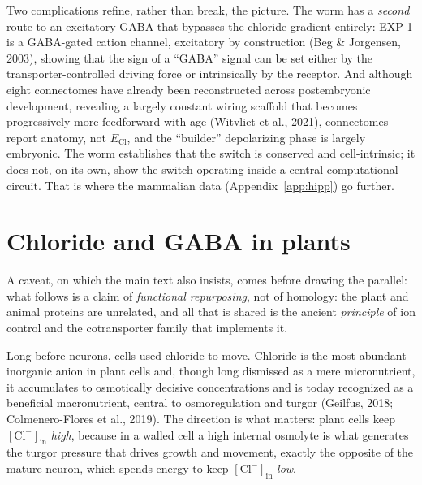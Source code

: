 \documentclass[11pt,a4paper]{article}
\newcommand{\Clm}{\mathrm{Cl}^{-}}
\newcommand{\ECl}{E_{\mathrm{Cl}}}
\begin{document}
Two complications refine, rather than break, the picture. The worm has a \emph{second} route to an excitatory GABA that bypasses the chloride gradient entirely: EXP-1 is a GABA-gated cation channel, excitatory by construction (Beg \& Jorgensen, 2003), showing that the sign of a ``GABA'' signal can be set either by the transporter-controlled driving force or intrinsically by the receptor. And although eight connectomes have already been reconstructed across postembryonic development, revealing a largely constant wiring scaffold that becomes progressively more feedforward with age (Witvliet et al., 2021), connectomes report anatomy, not $\ECl$, and the ``builder'' depolarizing phase is largely embryonic. The worm establishes that the switch is conserved and cell-intrinsic; it does not, on its own, show the switch operating inside a central computational circuit. That is where the mammalian data (Appendix~\ref{app:hipp}) go further.

\FloatBarrier
\section{Chloride and GABA in plants}\label{app:plants}
A caveat, on which the main text also insists, comes before drawing the parallel: what follows is a claim of \emph{functional repurposing}, not of homology: the plant and animal proteins are unrelated, and all that is shared is the ancient \emph{principle} of ion control and the cotransporter family that implements it.

Long before neurons, cells used chloride to move. Chloride is the most abundant inorganic anion in plant cells and, though long dismissed as a mere micronutrient, it accumulates to osmotically decisive concentrations and is today recognized as a beneficial macronutrient, central to osmoregulation and turgor (Geilfus, 2018; Colmenero-Flores et al., 2019). The direction is what matters: plant cells keep $[\Clm]_{\mathrm{in}}$ \emph{high}, because in a walled cell a high internal osmolyte is what generates the turgor pressure that drives growth and movement, exactly the opposite of the mature neuron, which spends energy to keep $[\Clm]_{\mathrm{in}}$ \emph{low}.
\end{document}
